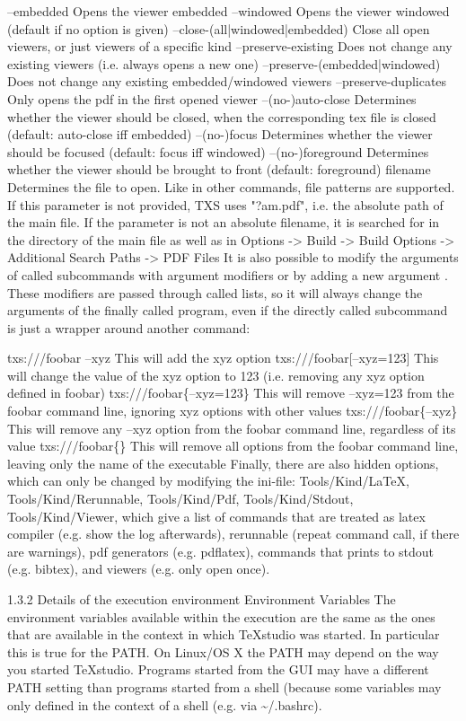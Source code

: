 \documentclass{article}
\begin{document}
	--embedded	Opens the viewer embedded
	--windowed	Opens the viewer windowed (default if no option is given)
	--close-(all|windowed|embedded)	Close all open viewers, or just viewers of a specific kind
	--preserve-existing	Does not change any existing viewers (i.e. always opens a new one)
	--preserve-(embedded|windowed)	Does not change any existing embedded/windowed viewers
	--preserve-duplicates	Only opens the pdf in the first opened viewer
	--(no-)auto-close	Determines whether the viewer should be closed, when the corresponding tex file is closed (default: auto-close iff embedded)
	--(no-)focus	Determines whether the viewer should be focused (default: focus iff windowed)
	--(no-)foreground	Determines whether the viewer should be brought to front (default: foreground)
	filename	Determines the file to open. Like in other commands, file patterns are supported. If this parameter is not provided, TXS uses "?am.pdf", i.e. the absolute path of the main file. If the parameter is not an absolute filename, it is searched for in the directory of the main file as well as in Options -> Build -> Build Options -> Additional Search Paths -> PDF Files
	It is also possible to modify the arguments of called subcommands with argument modifiers or by adding a new argument . These modifiers are passed through called lists, so it will always change the arguments of the finally called program, even if the directly called subcommand is just a wrapper around another command:
	
	txs:///foobar --xyz	This will add the xyz option
	txs:///foobar[--xyz=123]	This will change the value of the xyz option to 123 (i.e. removing any xyz option defined in foobar)
	txs:///foobar\{--xyz=123\}	This will remove --xyz=123 from the foobar command line, ignoring xyz options with other values	
	txs:///foobar\{--xyz\}	This will remove any --xyz option from the foobar command line, regardless of its value
	txs:///foobar\{\}	This will remove all options from the foobar command line, leaving only the name of the executable
	Finally, there are also hidden options, which can only be changed by modifying the ini-file: Tools/Kind/LaTeX, Tools/Kind/Rerunnable, Tools/Kind/Pdf, Tools/Kind/Stdout, Tools/Kind/Viewer, which give a list of commands that are treated as latex compiler (e.g. show the log afterwards), rerunnable (repeat command call, if there are warnings), pdf generators (e.g. pdflatex), commands that prints to stdout (e.g. bibtex), and viewers (e.g. only open once).
	
	1.3.2 Details of the execution environment
	Environment Variables
	The environment variables available within the execution are the same as the ones that are available in the context in which TeXstudio was started. In particular this is true for the PATH. On Linux/OS X the PATH may depend on the way you started TeXstudio. Programs started from the GUI may have a different PATH setting than programs started from a shell (because some variables may only defined in the context of a shell (e.g. via \~{}/.bashrc).
	
\end{document}
